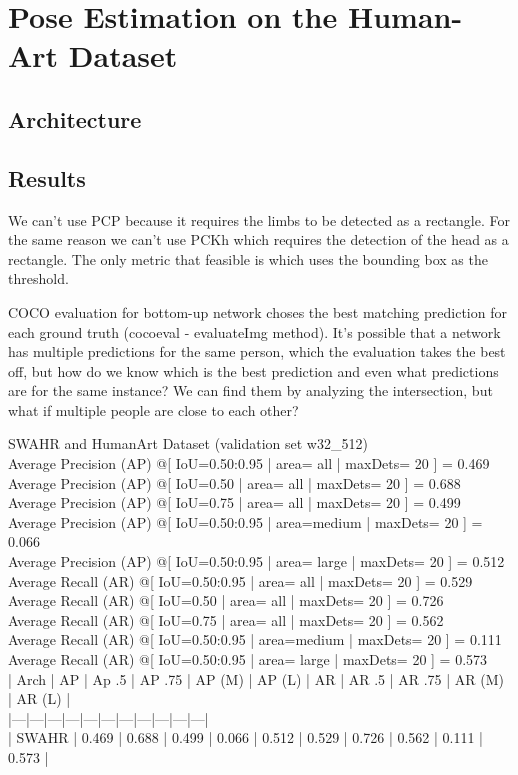 \label{sec:baseline_coco_style_transfer_results}

\section{Pose Estimation on the Human-Art Dataset}
\label{sec:baseline_human_art}

\subsection{Architecture}
\label{sec:baseline_human_art_architecture}

\subsection{Results}
\label{sec:baseline_human_art_results}
We can't use \gls{PCP} because it requires the limbs to be detected as a rectangle.
For the same reason we can't use \gls{PCKh} which requires the detection of the head as a rectangle.
The only metric that feasible is which uses the bounding box as the threshold.

COCO evaluation for bottom-up network choses the best matching prediction for each ground truth (cocoeval - evaluateImg method).
It's possible that a network has multiple predictions for the same person, which the evaluation takes the best off, but how do we know which is the best prediction and even what predictions are for the same instance?
We can find them by analyzing the intersection, but what if multiple people are close to each other?


SWAHR and HumanArt Dataset (validation set w32\_512)\\
Average Precision  (AP) @[ IoU=0.50:0.95 | area=   all | maxDets= 20 ] = 0.469\\
 Average Precision  (AP) @[ IoU=0.50      | area=   all | maxDets= 20 ] = 0.688\\
 Average Precision  (AP) @[ IoU=0.75      | area=   all | maxDets= 20 ] = 0.499\\
 Average Precision  (AP) @[ IoU=0.50:0.95 | area=medium | maxDets= 20 ] = 0.066\\
 Average Precision  (AP) @[ IoU=0.50:0.95 | area= large | maxDets= 20 ] = 0.512\\
 Average Recall     (AR) @[ IoU=0.50:0.95 | area=   all | maxDets= 20 ] = 0.529\\
 Average Recall     (AR) @[ IoU=0.50      | area=   all | maxDets= 20 ] = 0.726\\
 Average Recall     (AR) @[ IoU=0.75      | area=   all | maxDets= 20 ] = 0.562\\
 Average Recall     (AR) @[ IoU=0.50:0.95 | area=medium | maxDets= 20 ] = 0.111\\
 Average Recall     (AR) @[ IoU=0.50:0.95 | area= large | maxDets= 20 ] = 0.573\\
| Arch | AP | Ap .5 | AP .75 | AP (M) | AP (L) | AR | AR .5 | AR .75 | AR (M) | AR (L) |\\
|---|---|---|---|---|---|---|---|---|---|---|\\
| SWAHR | 0.469 | 0.688 | 0.499 | 0.066 | 0.512 | 0.529 | 0.726 | 0.562 | 0.111 | 0.573 |\\

